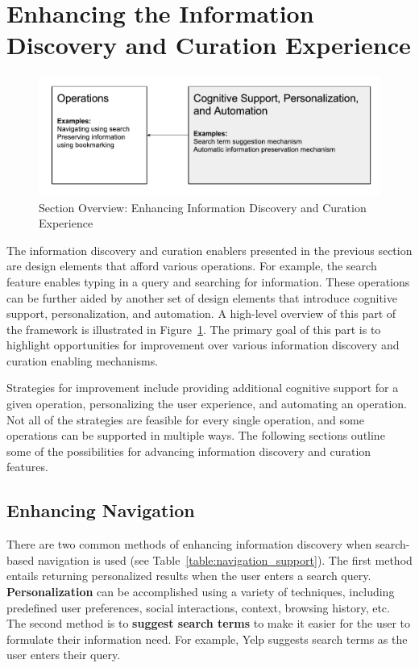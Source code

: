 \documentclass{sigchi}
\begin{document}
{{\section{Enhancing the Information Discovery and Curation Experience}
\label{section:enhancing}

\begin{figure}[ht!]
	\noindent
	\centering
    \includegraphics[width=\linewidth]{figures/enhancement.pdf}
	\caption{Section Overview: Enhancing Information Discovery and Curation Experience}
	\label{fig:enhancement} 
\end{figure}
The information discovery and curation enablers presented in the previous section are design elements that afford various operations. For example, the search feature enables typing in a query and searching for information. These operations can be further aided by another set of design elements that introduce cognitive support, personalization, and automation. A high-level overview of this part of the framework is illustrated in Figure~\ref{fig:enhancement}. The primary goal of this part is to highlight opportunities for improvement over various information discovery and curation enabling mechanisms.

Strategies for improvement include providing additional cognitive support for a given operation, personalizing the user experience, and automating an operation. Not all of the strategies are feasible for every single operation, and some operations can be supported in multiple ways. The following sections outline some of the possibilities for advancing information discovery and curation features. 

{\subsection{Enhancing Navigation}
There are two common methods of enhancing information discovery when search-based navigation is used (see Table~\ref{table:navigation_support}). The first method entails returning personalized results when the user enters a search query. \textbf{Personalization} can be accomplished using a variety of techniques, including predefined user preferences, social interactions, context, browsing history, etc. The second method is to \textbf{suggest search terms} to make it easier for the user to formulate their information need. For example, Yelp suggests search terms as the user enters their query.

}}}
\end{document}
